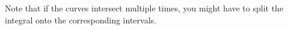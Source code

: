Note that if the curves intersect multiple times, you might have to split the integral onto the corresponding intervals.  

